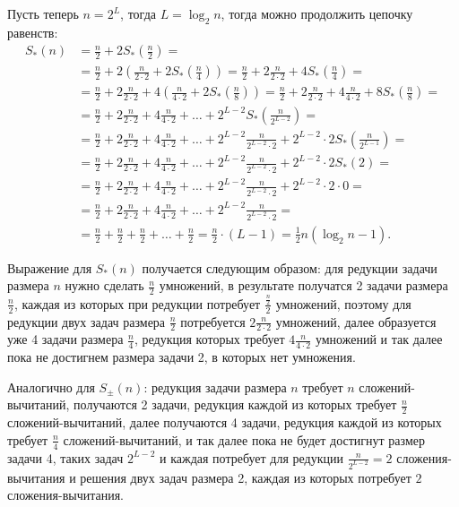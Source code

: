 Пусть теперь $n = 2^L$, тогда $L = \log_2 n$, тогда можно продолжить цепочку равенств:
\begin{align*}
    S_*(n)
    & = \frac{n}{2} + 2 S_*\left( \frac{n}{2} \right) = \\
    & = \frac{n}{2} + 2 \left( \frac{n}{2 \cdot 2} + 2 S_*\left( \frac{n}{4} \right) \right)
        = \frac{n}{2} + 2 \frac{n}{2 \cdot 2} + 4 S_*\left( \frac{n}{4} \right) = \\
    & = \frac{n}{2} + 2 \frac{n}{2 \cdot 2} + 4 \left( \frac{n}{4 \cdot 2} + 2 S_*\left( \frac{n}{8} \right) \right )
        = \frac{n}{2} + 2 \frac{n}{2 \cdot 2} + 4 \frac{n}{4 \cdot 2} + 8 S_*\left( \frac{n}{8} \right) = \\
    & = \frac{n}{2} + 2 \frac{n}{2 \cdot 2} + 4 \frac{n}{4 \cdot 2} + \dots + 2^{L-2} S_*\left( \frac{n}{2^{L-2}} \right ) = \\
    & = \frac{n}{2} + 2 \frac{n}{2 \cdot 2} + 4 \frac{n}{4 \cdot 2} + \dots + 2^{L-2} \frac{n}{2^{L-2} \cdot 2} + 2^{L-2} \cdot 2 S_*\left( \frac{n}{2^{L-1}} \right ) = \\
    & = \frac{n}{2} + 2 \frac{n}{2 \cdot 2} + 4 \frac{n}{4 \cdot 2} + \dots + 2^{L-2} \frac{n}{2^{L-2} \cdot 2} + 2^{L-2} \cdot 2 S_*(2) = \\
    & = \frac{n}{2} + 2 \frac{n}{2 \cdot 2} + 4 \frac{n}{4 \cdot 2} + \dots + 2^{L-2} \frac{n}{2^{L-2} \cdot 2} + 2^{L-2} \cdot 2 \cdot 0 = \\
    & = \frac{n}{2} + 2 \frac{n}{2 \cdot 2} + 4 \frac{n}{4 \cdot 2} + \dots + 2^{L-2} \frac{n}{2^{L-2} \cdot 2} = \\
    & = \frac{n}{2} + \frac{n}{2} + \frac{n}{2} + \dots + \frac{n}{2}
        = \frac{n}{2} \cdot (L-1)
        = \frac{1}{2} n \left( \log_2 n - 1 \right).
\end{align*}

Выражение для $S_*(n)$ получается следующим образом: для редукции задачи размера $n$ нужно сделать $\frac{n}{2}$ умножений,
в результате получатся 2 задачи размера $\frac{n}{2}$, каждая из которых при редукции потребует
$\frac{\frac{n}{2}}{2}$ умножений, поэтому для редукции двух задач размера $\frac{n}{2}$ потребуется $2 \frac{n}{2 \cdot 2}$ умножений,
далее образуется уже 4 задачи размера $\frac{n}{4}$, редукция которых требует $4 \frac{n}{4 \cdot 2}$ умножений и так далее пока не достигнем размера
задачи 2, в которых нет умножения. 

Аналогично для $S_\pm(n)$: редукция задачи размера $n$ требует $n$ сложений-вычитаний, получаются 2 задачи, редукция каждой из которых требует
$\frac{n}{2}$ сложений-вычитаний, далее получаются 4 задачи, редукция каждой из которых требует $\frac{n}{4}$ сложений-вычитаний, и так далее пока не будет
достигнут размер задачи 4, таких задач $2^{L-2}$ и каждая потребует для редукции $\frac{n}{2^{L-2}} = 2$ сложения-вычитания и решения двух задач
размера 2, каждая из которых потребует $2$ сложения-вычитания.

